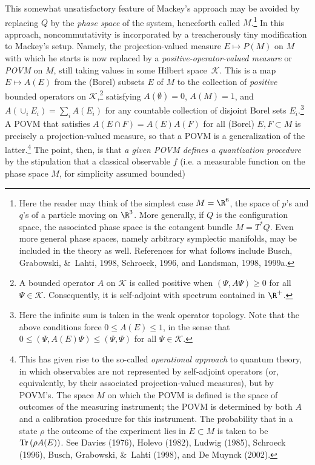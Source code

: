 \documentclass[12pt]{article}
\newcommand{\Hs}{Hilbert space} \newcommand{\Bs}{Banach space}
\newcommand{\Tr}{\mbox{\rm Tr}\,} \newcommand{\Ad}{{\rm Ad}}
\newcommand{\rh}{\rho} \newcommand{\sg}{\sigma}
\newcommand{\CK}{{\mathcal K}}   \newcommand{\CL}{{\mathcal L}}
\begin{document}
This somewhat unsatisfactory feature of Mackey's approach may be avoided by replacing $Q$  by the {\it phase space} of the system, henceforth called $M$.\footnote{Here the reader may think of the simplest case $M=\R^6$, the space of $p$'s and $q$'s of a particle moving on $\R^3$. More generally, if $Q$ is the configuration space, the associated phase space is the cotangent bundle $M=T^*Q$. Even more general phase spaces, namely arbitrary symplectic manifolds, may be included  in the theory as well. References for what follows include Busch,  Grabowski, \&\ Lahti, 1998, Schroeck, 1996, and Landsman, 1998, 1999a.  } In this approach, noncommutativity is incorporated by a treacherously  tiny modification to Mackey's setup. Namely, the projection-valued measure $E\mapsto P(M)$ on $M$ with which he starts is now replaced by a {\it positive-operator-valued measure} or {\it POVM} on $M$, still taking values in some \Hs\ $\CK$. This is  a map $E\mapsto A(E)$ from the (Borel)
subsets $E$ of $M$ to the collection of {\it positive} bounded operators on $\CK$,\footnote{A bounded operator $A$ on $\CK$ is called positive when $(\Psi,A\Psi)\geq 0$ for all $\Psi\in\CK$.
Consequently, it is self-adjoint with spectrum contained in $\R^+$.}
satisfying $A(\emptyset)=0$, $A(M)=1$, and 
$A(\cup_i E_i)=\sum_i A(E_i)$ for any countable collection of disjoint Borel sets $E_i$.\footnote{Here the infinite sum is taken in the weak operator topology.
 Note that the above conditions force $0\leq A(E)\leq 1$, in the sense that
$0\leq (\Psi, A(E)\Psi)\leq (\Psi,\Psi)$ for all $\Psi\in\CK$.} A POVM that satisfies
$A(E\cap F)  =  A(E)A(F)$ for all (Borel) $E,F\subset M$ is precisely a projection-valued measure, so that a POVM is a generalization of the latter.\footnote{This has given rise to the so-called {\it operational approach} to quantum theory, in which observables are not represented by self-adjoint operators (or, equivalently, by their associated  projection-valued measures), but by POVM's.  The space $M$ on which the POVM is defined is the space of outcomes of the measuring instrument; the POVM
is determined by both $A$ and a calibration procedure for this instrument.  The probability that in a state $\rh$ the outcome of the experiment lies in $E\subset M$ is taken to be $\Tr (\rh A(E))$. See Davies (1976), Holevo (1982), Ludwig (1985),  Schroeck (1996), Busch,  Grabowski, \&\ Lahti (1998),  and De Muynck (2002).} The point, then, is that {\it a given POVM defines a quantization procedure} by the stipulation that a classical observable $f$
(i.e. a measurable function on the phase space $M$, for simplicity assumed bounded)
\end{document}
